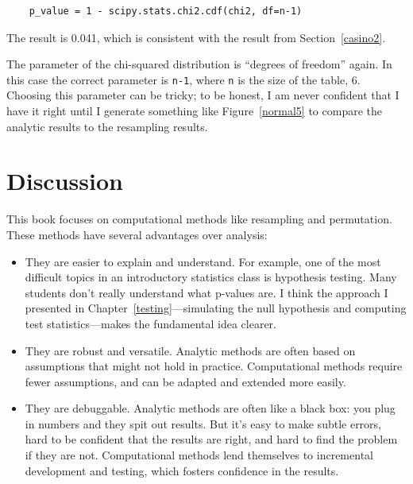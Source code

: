 \documentclass[12pt]{book}
\begin{document}
\begin{verbatim}
    p_value = 1 - scipy.stats.chi2.cdf(chi2, df=n-1)
\end{verbatim}

The result is 0.041, which is consistent with the result
from Section~\ref{casino2}.

The parameter of the chi-squared distribution is ``degrees of
freedom'' again.  In this case the correct parameter is {\tt n-1},
where {\tt n} is the size of the table, 6.  Choosing this parameter
can be tricky; to be honest, I am never confident that I have it
right until I generate something like Figure~\ref{normal5} to compare
the analytic results to the resampling results.


\section{Discussion}

This book focuses on computational methods like resampling and
permutation.  These methods have several advantages over analysis:

\begin{itemize}

\item They are easier to explain and understand.  For example, one of
  the most difficult topics in an introductory statistics class is
  hypothesis testing.  Many students don't really understand what
  p-values are.  I think the approach I presented in
  Chapter~\ref{testing}---simulating the null hypothesis and
  computing test statistics---makes the fundamental idea clearer.

\item They are robust and versatile.  Analytic methods are often based
  on assumptions that might not hold in practice.  Computational
  methods require fewer assumptions, and can be adapted and extended
  more easily.

\item They are debuggable.  Analytic methods are often like a black
  box: you plug in numbers and they spit out results.  But it's easy
  to make subtle errors, hard to be confident that the results are
  right, and hard to find the problem if they are not.  Computational
  methods lend themselves to incremental development and testing,
  which fosters confidence in the results.

\end{itemize}
\end{document}

